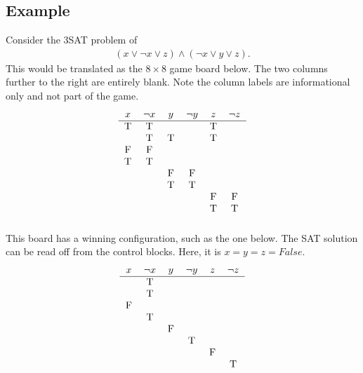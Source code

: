 \documentclass[a4paper]{article}
\begin{document}
\subsection*{Example}
Consider the 3SAT problem of
\begin{align*}
  (x \vee \neg x \vee z) \wedge (\neg x \vee y \vee z).
\end{align*}
This would be translated as the $8\times8$ game board below. 
The two columns further to the right are entirely blank.
Note the column labels are informational only and not part of the game.
\begin{align*}
\begin{blockarray}{cccccc}
  x & \neg x&
  y & \neg y&
z & \neg z
\\ \hline
\begin{block}{cccccc}
  \text T & \text T & & & \text T \\
          &\text T  & \text T & & \text T \\
  \text F & \text F  \\
  \text T & \text T  \\
          && \text F & \text F  \\
          && \text T & \text T  \\
          &&&& \text F & \text F  \\
          &&&& \text T & \text T  \\
\end{block}
\end{blockarray}
\end{align*}
This board has a winning configuration, such as the one below.
The SAT solution can be read off from the control blocks.
Here, it is $x = y = z = \textit{False}$.
\begin{align*}
\begin{blockarray}{cccccc}
  x & \neg x&
  y & \neg y&
z & \neg z
\\ \hline
\begin{block}{cccccc}
  & \text T & & & \\
          &\text T  & & & \\
  \text F & \\
  & \text T  \\
          && \text F & \\
          && & \text T  \\
          &&&& \text F & \\
          &&&& & \text T  \\
\end{block}
\end{blockarray}
\end{align*}
\end{document}
